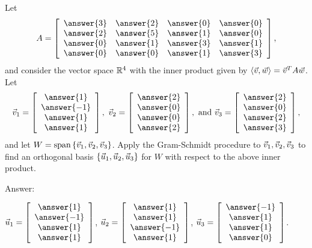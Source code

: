 \documentclass{ximera}
\begin{document}
\begin{problem}
  Let
  \begin{equation*}
    A = \startmat{cccc}
      \answer{3} & \answer{2} & \answer{0} & \answer{0} \\
      \answer{2} & \answer{5} & \answer{1} & \answer{0} \\
      \answer{0} & \answer{1} & \answer{3} & \answer{1} \\
      \answer{0} & \answer{0} & \answer{1} & \answer{3} \\
    \stopmat,
  \end{equation*}
  and consider the vector space $\mathbb{R}^4$ with the inner product given by
  $\langle \vec{v},\vec{w} \rangle = \vec{v}^T A\vec{w}$.
  Let
  \begin{equation*}
    \vect{v}_1 = \startmat{c} \answer{1} \\ \answer{-1} \\ \answer{1} \\ \answer{1} \stopmat,
    \quad
    \vect{v}_2 = \startmat{c} \answer{2} \\ \answer{0} \\ \answer{0} \\ \answer{2} \stopmat,
    \quad\mbox{and}\quad
    \vect{v}_3 = \startmat{c} \answer{2} \\ \answer{0} \\ \answer{2} \\ \answer{3} \stopmat,
  \end{equation*}
  and let $W=\text{span}\left\{\vec{v}_1,\vec{v}_2,\vec{v}_3\right\}$.  Apply the
  Gram-Schmidt procedure to $\vec{v}_1,\vec{v}_2,\vec{v}_3$ to find
  an orthogonal basis $\left\{\vec{u}_1,\vec{u}_2,\vec{u}_3\right\}$ for $W$
  with respect to the above inner product.

  Answer:


    $\vect{u}_1 = \startmat{c} \answer{1} \\ \answer{-1} \\ \answer{1} \\ \answer{1} \stopmat$,
    $\vect{u}_2 = \startmat{c} \answer{1} \\ \answer{1} \\ \answer{-1} \\ \answer{1} \stopmat$,
    $\vect{u}_3 = \startmat{c} \answer{-1} \\ \answer{1} \\ \answer{1} \\ \answer{0} \stopmat$.

\end{problem}
\end{document}
